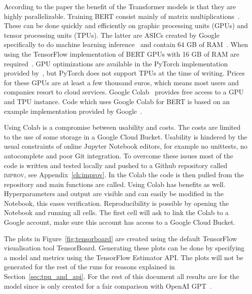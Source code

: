 According to the paper the benefit of the Transformer models is that they are highly parallelizable.
Training BERT consist mainly of matrix multiplications~\citep{dettmers2018}.
These can be done quickly and efficiently on graphic processing units (GPUs) and tensor processing units (TPUs).
The latter are ASICs created by Google specifically to do machine learning inference~\citep{jouppi2017} and contain 64 GB of RAM~\citep{devlin2018github}.
When using the TensorFlow implementation of BERT GPUs with 16 GB of RAM are required~\citep{devlin2018github}.
GPU optimizations are available in the PyTorch implementation provided by~\citet{wolf2018}, but PyTorch does not support TPUs at the time of writing.
Prices for these GPUs are at least a few thousand euros, which means most users and companies resort to cloud services.
Google Colab~\citet{google2019colab} provides free access to a GPU and TPU instance.
Code which uses Google Colab for BERT is based on an example implementation provided by Google~\citep{bajaj2018}.

Using Colab is a compromise between usability and costs.
The costs are limited to the use of some storage in a Google Cloud Bucket.
Usability is hindered by the usual constraints of online Jupyter Notebook editors, for example no unittests, no autocomplete and poor Git integration.
To overcome these issues most of the code is written and tested locally and pushed to a Github repository called \textsc{improv}, see Appendix~\ref{ch:improv}.
In the Colab the code is then pulled from the repository and main functions are called.
Using Colab has benefits as well.
Hyperparameters and output are visible and can easily be modified in the Notebook, this eases verification.
Reproducibility is possible by opening the Notebook and running all cells.
The first cell will ask to link the Colab to a Google account, make sure this account has access to a Google Cloud Bucket.

The plots in Figure~\ref{fig:tensorboard} are created using the default TensorFlow visualisation tool TensorBoard.
Generating these plots can be done by specifying a model and metrics using the TensorFlow Estimator API.
The plots will not be generated for the rest of the runs for reasons explained in Section~\ref{sec:tpu_and_api}.
For the rest of this document all results are for the  model since  is only created for a fair comparison with OpenAI GPT~\citep{devlin2018}.

